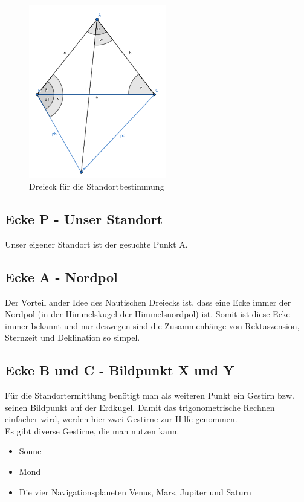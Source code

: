 \begin{figure}[h]
	\begin{center}
		\includegraphics[width=6cm]{papers/nav/bilder/dreieck.png}
		\caption[Dreieck für die Standortbestimmung]{Dreieck für die Standortbestimmung}
	\end{center}
\end{figure}




\subsection{Ecke P - Unser Standort}
Unser eigener Standort ist der gesuchte Punkt A. 

\subsection{Ecke A - Nordpol}
Der Vorteil ander Idee des Nautischen Dreiecks ist, dass eine Ecke immer der Nordpol (in der Himmelskugel der Himmelsnordpol) ist. 
Somit ist diese Ecke immer bekannt und nur deswegen sind die Zusammenhänge von Rektaszension, Sternzeit und Deklination so simpel.
\newpage
\subsection{Ecke B und C - Bildpunkt X und Y}
Für die Standortermittlung benötigt man als weiteren Punkt ein Gestirn bzw. seinen Bildpunkt auf der Erdkugel. 
Damit das trigonometrische Rechnen einfacher wird, werden hier zwei Gestirne zur Hilfe genommen.
\\
Es gibt diverse Gestirne, die man nutzen kann.
\begin{itemize}
	\item Sonne
	\item Mond
	\item Die vier Navigationsplaneten Venus, Mars, Jupiter und Saturn
\end{itemize} 

